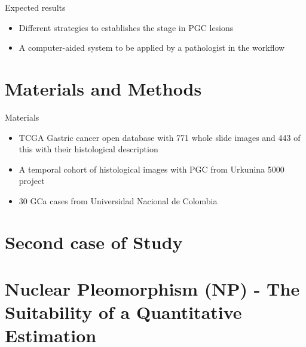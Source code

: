 \documentclass[usenames,dvipsnames]{beamer}
\begin{document}
\begin{frame}{Expected results}
\begin{itemize}
\item Different strategies to establishes the stage in PGC lesions
\item A computer-aided system to be applied by a pathologist in the workflow
\end{itemize}
\end{frame}

\section{Materials and Methods}
\begin{frame}{Materials}
\begin{itemize}
\item  TCGA Gastric cancer open database with 771 whole slide images and 443 of this with their histological description
\item A temporal cohort of histological images with PGC from Urkunina 5000 project
\item 30 GCa cases from Universidad Nacional de Colombia
\end{itemize}

\end{frame}
%
%


\section{Second case of Study}

\section{ Nuclear Pleomorphism (NP) - The Suitability of a Quantitative Estimation}
\end{document}
